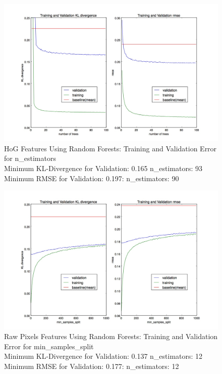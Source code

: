 \documentclass[10pt]{article}
\begin{document}
\begin{figure}
\begin{center}
\includegraphics[scale=0.4]{images/HoG_Random_Forest_n_estimators.jpg}
\caption{HoG Features Using Random Forests: Training and Validation Error for n\_estimators \\
         Minimum KL-Divergence for Validation: 0.165 n\_estimators: 93 \\
         Minimum RMSE for Validation: 0.197: n\_estimators: 90}
\label{fig:rawdreval}
\end{center}
\end{figure}


\begin{figure}
\begin{center}
\includegraphics[scale=0.4]{images/Raw_Features_Random_Forest_min_samples_split.jpg}
\caption{Raw Pixels Features Using Random Forests: Training and Validation Error for min\_samples\_split \\
         Minimum KL-Divergence for Validation: 0.137 n\_estimators: 12 \\
         Minimum RMSE for Validation: 0.177: n\_estimators: 12}
\label{fig:rawdreval}
\end{center}
\end{figure}
\end{document}
